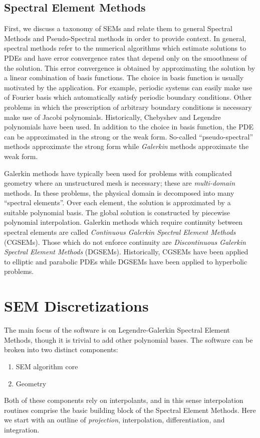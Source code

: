 \documentclass[12pt]{softwaremanual}
\begin{document}
 
\section{Spectral Element Methods} 
First, we discuss a taxonomy of SEMs and relate them to general Spectral Methods and Pseudo-Spectral methods in order to provide context. In general, spectral methods refer to the numerical algorithms which estimate solutions to PDEs and have error convergence rates that depend only on the smoothness of the solution. This error convergence is obtained by approximating the solution by a linear combination of basis functions. The choice in basis function is usually motivated by the application. For example, periodic systems can easily make use of Fourier basis which automatically satisfy periodic boundary conditions. Other problems in which the prescription of arbitrary boundary conditions is necessary make use of Jacobi polynomials. Historically, Chebyshev and Legendre polynomials have been used. In addition to the choice in basis function, the PDE can be approximated in the strong or the weak form. So-called ``pseudo-spectral'' methods approximate the strong form while \textit{Galerkin} methods approximate the weak form. 

Galerkin methods have typically been used for problems with complicated geometry where an unstructured mesh is necessary; these are \textit{multi-domain} methods. In these problems, the physical domain is decomposed into many ``spectral elements''. Over each element, the solution is approximated by a suitable polynomial basis. The global solution is constructed by piecewise polynomial interpolation. Galerkin methods which require continuity between spectral elements are called \textit{Continuous Galerkin Spectral Element Methods} (CGSEMs). Those which do not enforce continuity are \textit{Discontinuous Galerkin Spectral Element Methods} (DGSEMs). Historically, CGSEMs have been applied to elliptic and parabolic PDEs while DGSEMs have been applied to hyperbolic problems.  

\chapter{SEM Discretizations}
The main focus of the software is on Legendre-Galerkin Spectral Element Methods, though it is trivial to add other polynomial bases. The software can be broken into two distinct components:
\begin{enumerate}
\item SEM algorithm core
\item Geometry
\end{enumerate}
Both of these components rely on interpolants, and in this sense interpolation routines comprise the basic building block of the Spectral Element Methods. Here we start with an outline of \textit{projection}, interpolation, differentiation, and integration.
\end{document}
